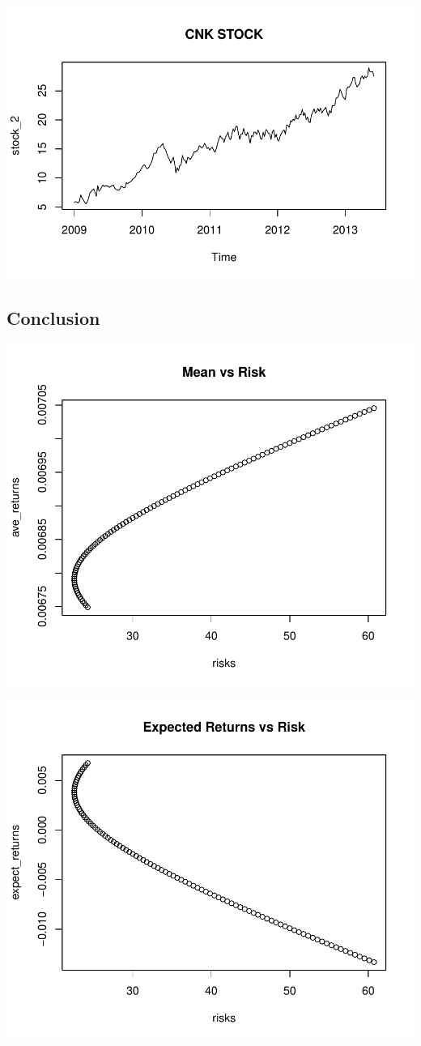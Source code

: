\documentclass[english]{report}
\begin{document}
\includegraphics{MV_report-007}
\subsection{Conclusion}

\includegraphics{MV_report-008}

\includegraphics{MV_report-009}
\end{document}
